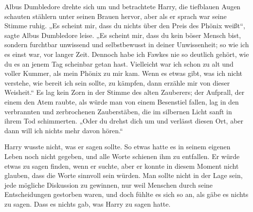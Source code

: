 Albus Dumbledore drehte sich um und betrachtete Harry, die tiefblauen Augen schauten stählern unter seinen Brauen hervor, aber als er sprach war seine Stimme ruhig.
„Es scheint mir, dass du nichts über den Preis des Phönix weißt“, sagte Albus Dumbledore leise.
„Es scheint mir, dass du kein böser Mensch bist, sondern furchtbar unwissend und selbstbewusst in deiner Unwissenheit; so wie ich es einst war, vor langer Zeit. Dennoch habe ich Fawkes nie so deutlich gehört, wie du es an jenem Tag scheinbar getan hast. Vielleicht war ich schon zu alt und voller Kummer, als mein Phönix zu mir kam. Wenn es etwas gibt, was ich nicht verstehe, wie bereit ich sein sollte, zu kämpfen, dann erzähle mir von dieser Weisheit.“ Es lag kein Zorn in der Stimme des alten Zauberers; der Aufprall, der einem den Atem raubte, als würde man von einem Besenstiel fallen, lag in den verbrannten und zerbrochenen Zauberstäben, die im silbernen Licht sanft in ihrem Tod schimmerten.
„Oder du drehst dich um und verlässt diesen Ort, aber dann will ich nichts mehr davon hören.“

Harry wusste nicht, was er sagen sollte. So etwas hatte es in seinem eigenen Leben noch nicht gegeben, und alle Worte schienen ihm zu entfallen. Er würde etwas zu sagen finden, wenn er suchte, aber er konnte in diesem Moment nicht glauben, dass die Worte sinnvoll sein würden. Man sollte nicht in der Lage sein, jede mögliche Diskussion zu gewinnen, nur weil Menschen durch seine Entscheidungen gestorben waren, und doch fühlte es sich so an, als gäbe es nichts zu sagen. Dass es nichts gab, was Harry zu sagen hatte.

